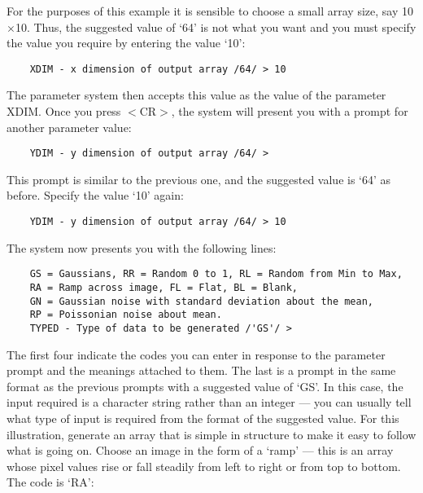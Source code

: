 For the purposes of this example it is sensible to choose a small array size,
say 10$\times$10.
Thus, the suggested value of `64' is not what you want and you must specify
the value you require by entering the value `10':

\begin{small}
\begin{verbatim}
    XDIM - x dimension of output array /64/ > 10
\end{verbatim}
\end{small}

The parameter system then accepts this value as the value of the parameter XDIM.
Once you press $<$CR$>$, the system will present you with a prompt for another
parameter value:

\begin{small}
\begin{verbatim}
    YDIM - y dimension of output array /64/ > 
\end{verbatim}
\end{small}

This prompt is similar to the previous one, and the suggested value is `64' as
before.
Specify the value `10' again:

\begin{small}
\begin{verbatim}
    YDIM - y dimension of output array /64/ > 10
\end{verbatim}
\end{small}

The system now presents you with the following lines:

\begin{small}
\begin{verbatim}
    GS = Gaussians, RR = Random 0 to 1, RL = Random from Min to Max,
    RA = Ramp across image, FL = Flat, BL = Blank,
    GN = Gaussian noise with standard deviation about the mean, 
    RP = Poissonian noise about mean.
    TYPED - Type of data to be generated /'GS'/ > 
\end{verbatim}
\end{small}

The first four indicate the codes you can enter in response to the parameter
prompt and the meanings attached to them.
The last is a prompt in the same format as the previous prompts with a
suggested value of `GS'.
In this case, the input required is a character string rather than an integer
--- you can usually tell what type of input is required from the format of
the suggested value.
For this illustration, generate an array that is simple in structure to make
it easy to follow what is going on.
Choose an image in the form of a `ramp' --- this is an array whose
pixel values rise or fall steadily from left to right or from top to bottom.
The code is `RA':


